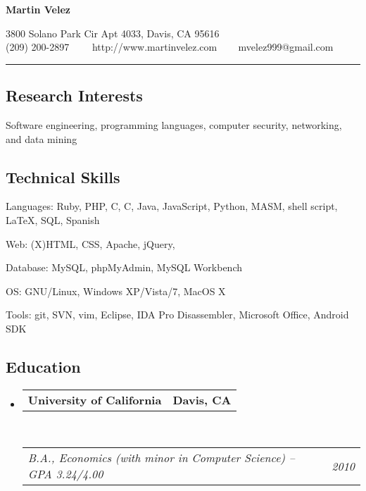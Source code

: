 \documentclass[10pt,letterpaper]{article}
\makeatletter
\newenvironment{indentsection}[1]%
{\begin{list}{}%
	{\setlength{\leftmargin}{#1}}%
	\item[]%
}
{\end{list}}
\newcommand{\headerrow}[2]
{\begin{tabular*}{\linewidth}{l@{\extracolsep{\fill}}r}
	#1 &
	#2 \\
\end{tabular*}}
\newcommand{\CPP}
{C\nolinebreak[4]\hspace{-.05em}\raisebox{.22ex}{\footnotesize\bf ++}}
\makeatother
\begin{document}
\begin{center}
{\LARGE \sc \textbf{Martin Velez}}

3800 Solano Park Cir Apt 4033, Davis, CA 95616
\\
(209) 200-2897\ \ \textbullet
\ \ http://www.martinvelez.com \ \textbullet
\ \ mvelez999@gmail.com
\end{center}

\hrule
\vspace{-0.4em}
\subsection*{Research Interests}

\begin{indentsection}{\parindent}
Software engineering, programming languages, computer security, networking,
and data mining 
\end{indentsection}


\vspace{-0.4em}
\subsection*{Technical Skills}

\begin{indentsection}{\parindent}
\begin{description*}
	\item[Languages:]
	Ruby, PHP, C, \CPP, Java, JavaScript, Python, MASM, shell script, \LaTeX, 
	SQL, Spanish
	\item[Web:]
	(X)HTML, CSS, Apache, jQuery, 
	\item[Database:]
	MySQL, phpMyAdmin, MySQL Workbench
	\item[OS:]
	GNU/Linux, Windows XP/Vista/7, MacOS X
	\item[Tools:]
	git, SVN, vim, Eclipse, IDA Pro Disassembler, Microsoft Office, Android SDK
\end{description*}
\end{indentsection}


\vspace{-0.4em}
\subsection*{Education}

\begin{itemize}
	\parskip=0.1em

	\item 
	\headerrow
		{\textbf{University of California}}
		{\textbf{Davis, CA}}
	\\
	\headerrow
		{\emph{B.A., Economics (with minor in Computer Science) -- GPA 3.24/4.00}}
		{\emph{2010}}

\end{itemize}
\end{document}
